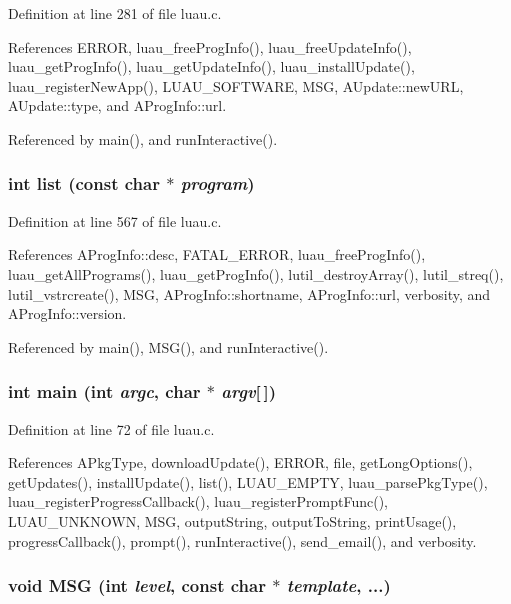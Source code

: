 Definition at line 281 of file luau.c.

References ERROR, luau\_\-free\-Prog\-Info(), luau\_\-free\-Update\-Info(), luau\_\-get\-Prog\-Info(), luau\_\-get\-Update\-Info(), luau\_\-install\-Update(), luau\_\-register\-New\-App(), LUAU\_\-SOFTWARE, MSG, AUpdate::new\-URL, AUpdate::type, and AProg\-Info::url.

Referenced by main(), and run\-Interactive().
\subsubsection{\setlength{\rightskip}{0pt plus 5cm}int list (const char $\ast$ {\em program})\hspace{0.3cm}{\tt  [static]}}\label{luau_8c_a11}




Definition at line 567 of file luau.c.

References AProg\-Info::desc, FATAL\_\-ERROR, luau\_\-free\-Prog\-Info(), luau\_\-get\-All\-Programs(), luau\_\-get\-Prog\-Info(), lutil\_\-destroy\-Array(), lutil\_\-streq(), lutil\_\-vstrcreate(), MSG, AProg\-Info::shortname, AProg\-Info::url, verbosity, and AProg\-Info::version.

Referenced by main(), MSG(), and run\-Interactive().
\subsubsection{\setlength{\rightskip}{0pt plus 5cm}int main (int {\em argc}, char $\ast$ {\em argv}[$\,$])}\label{luau_8c_a16}




Definition at line 72 of file luau.c.

References APkg\-Type, download\-Update(), ERROR, file, get\-Long\-Options(), get\-Updates(), install\-Update(), list(), LUAU\_\-EMPTY, luau\_\-parse\-Pkg\-Type(), luau\_\-register\-Progress\-Callback(), luau\_\-register\-Prompt\-Func(), LUAU\_\-UNKNOWN, MSG, output\-String, output\-To\-String, print\-Usage(), progress\-Callback(), prompt(), run\-Interactive(), send\_\-email(), and verbosity.
\subsubsection{\setlength{\rightskip}{0pt plus 5cm}void MSG (int {\em level}, const char $\ast$ {\em template}, ...)\hspace{0.3cm}{\tt  [static]}}\label{luau_8c_a3}





